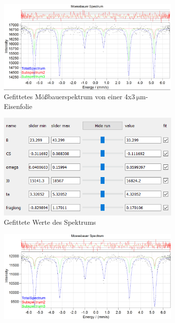 \documentclass[german, %
parskip=full, %
bibliography=totoc, %
]{scrartcl}
\begin{document}
\begin{figure}[ht]
	\centering
	\begin{subfigure}[b]{0.5\textwidth}
		\includegraphics[width=\textwidth]{MoessbauerEisen4x3frag}
	  \caption{Gefittetes Mößbauerspektrum von einer 4x\(\SI{3}{\micro\meter}\)-Eisenfolie}
	  \label{fig:moess4x3fr}
  \end{subfigure}
  \begin{subfigure}[b]{0.4\textwidth}
	  \includegraphics[width=\textwidth]{WerteEisen4x3frag}
	  \caption{Gefittete Werte des Spektrums}
	  \label{fig:werte4x3fr}
  \end{subfigure}
	\begin{subfigure}[b]{0.5\textwidth}
		\includegraphics[width=\textwidth]{MoessbauerEisen25frag}

\end{subfigure}
\end{figure}
\end{document}

